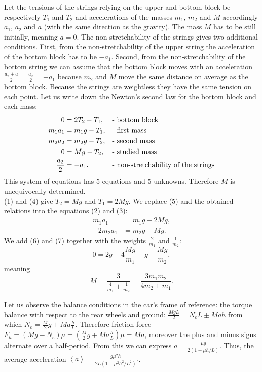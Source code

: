 \documentclass[11pt]{article}
\begin{document}
\solueng
Let the tensions of the strings relying on the upper and bottom block be respectively $T_1$ and $T_2$ and accelerations of the masses $m_1$, $m_2$ and $M$ accordingly $a_1$, $a_2$ and $a$ (with the same direction as the gravity). The mass $M$ has to be still initially, meaning $a = 0$. The non-stretchability of the strings gives two additional conditions. First, from the non-stretchability of the upper string the acceleration of the bottom block has to be $-a_1$. Second, from the non-stretchability of the bottom string we can assume that the bottom block moves with an acceleration $\frac{a_2 + a}{2} = \frac{a_2}{2} = -a_1$ because $m_2$ and $M$ move the same distance on average as the bottom block. Because the strings are weightless they have the same tension on each point. Let us write down the Newton’s second law for the bottom block and each mass:
\begin{align}
0 &= 2T_2 - T_1,				& &\text{- bottom block}\label{Plokid:eq-1}\\
m_1a_1 &= m_1g - T_1,			& &\text{- first mass}\label{Plokid:eq-2}\\
m_2a_2 &= m_2g - T_2,			& &\text{- second mass}\label{Plokid:eq-3}\\
0 &= Mg - T_2,					& &\text{- studied mass}\label{Plokid:eq-4}\\
\frac{a_2}{2} &= -a_1.			& &\text{- non-stretchability of the strings\label{Plokid:eq-5}}
\end{align} 
This system of equations has 5 equations and 5 unknowns. Therefore $M$ is unequivocally determined.\\
(1) and (4) give $T_2 = Mg$ and $T_1 = 2Mg$. We replace (5) and the obtained relations into the equations (2) and (3):
\begin{align}
m_1a_1 &= m_1g - 2Mg, \label{Plokid:eq-6}\\
-2m_2a_1 &= m_2g - Mg. \label{Plokid:eq-7}
\end{align} 
We add (6) and (7) together with the weights $\frac{2}{m_1}$ and $\frac{1}{m_2}$:
\[
0 = 2g - 4\frac{Mg}{m_1} + g - \frac{Mg}{m_2},
\] 
meaning
\[
M = \frac{3}{\frac{4}{m_1} + \frac{1}{m_2}} = \frac{3m_1m_2}{4m_2 + m_1}.
\]
\probend
\bigskip


\solueng
Let us observe the balance conditions in the car’s frame of reference: the torque balance with respect to the rear wheels and ground: $\frac {MgL}2=N_eL\pm Mah$ from which $N_e=\frac M2g\pm Ma\frac hL$. Therefore friction force $F_h=(Mg-N_e)\mu=(\frac M2g\mp Ma\frac hL)\mu=Ma$, moreover the plus and minus signs alternate over a half-period. From this we can express $a=\frac{\mu g}{2(1\pm \mu h/L)}$. Thus, the average acceleration $\left< a\right>=\frac{g\mu^2h}{2L(1-\mu^2h^2/L^2)}.$.
\probend
\bigskip
\end{document}
